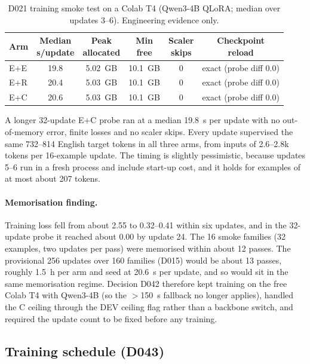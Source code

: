 \documentclass[12pt,a4paper,oneside]{report}
\renewcommand{\_}{\oldunderscore\allowbreak}
\begin{document}
\begin{table}[t]
\centering\small
\caption{D021 training smoke test on a Colab T4 (Qwen3-4B QLoRA; median over updates 3--6). Engineering evidence only.}
\label{tab:smoke}
\begin{tabular}{@{}lccccc@{}}
\toprule
Arm & \makecell{Median\\s/update} & \makecell{Peak\\allocated} & \makecell{Min\\free} & \makecell{Scaler\\skips} & \makecell{Checkpoint\\reload}\\
\midrule
E+E & 19.8 & 5.02~GB & 10.1~GB & 0 & exact (probe diff 0.0)\\
E+R & 20.4 & 5.03~GB & 10.1~GB & 0 & exact (probe diff 0.0)\\
E+C & 20.6 & 5.03~GB & 10.1~GB & 0 & exact (probe diff 0.0)\\
\bottomrule
\end{tabular}
\end{table}

A longer 32-update E+C probe ran at a median 19.8~s per update with no out-of-memory error, finite losses and no scaler skips. Every update supervised the same 732--814 English target tokens in all three arms, from inputs of 2.6--2.8k tokens per 16-example update. The timing is slightly pessimistic, because updates 5--6 run in a fresh process and include start-up cost, and it holds for examples of at most about 207 tokens.

\paragraph{Memorisation finding.} Training loss fell from about 2.55 to 0.32--0.41 within six updates, and in the 32-update probe it reached about 0.00 by update 24. The 16 smoke families (32 examples, two updates per pass) were memorised within about 12 passes. The provisional 256 updates over 160 families (D015) would be about 13 passes, roughly 1.5~h per arm and seed at 20.6~s per update, and so would sit in the same memorisation regime. Decision D042 therefore kept training on the free Colab T4 with Qwen3-4B (so the $>$150~s fallback no longer applies), handled the C ceiling through the DEV ceiling flag rather than a backbone switch, and required the update count to be fixed before any training.

\subsection{Training schedule (D043)}
\end{document}
